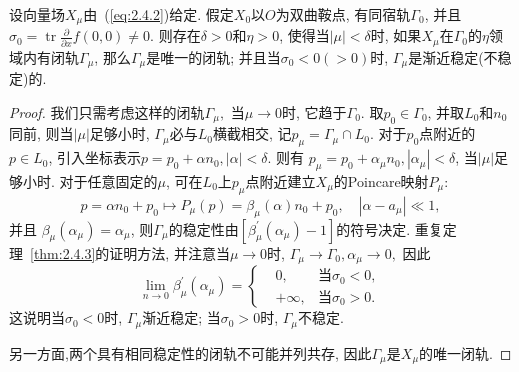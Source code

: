 \begin{theorem}
  \label{thm:2.4.4}
  设向量场$X_{\mu}$由~(\ref{eq:2.4.2})给定.
  假定$X_0$以$O$为双曲鞍点,
  有同宿轨$\Gamma_0$,
  并且$\sigma_{0}=\operatorname{tr} \frac{\partial}{\partial x} f(0,0) \neq 0$.
  则存在$\delta>0$和$\eta>0$,
  使得当$|\mu|<\delta$时,
  如果$X_{\mu}$在$\Gamma_{0}$的$\eta$领域内有闭轨$\Gamma_{\mu}$,
  那么$\Gamma_{\mu}$是唯一的闭轨;
  并且当$\sigma_0<0(>0)$时,
  $\Gamma_{\mu}$是渐近稳定(不稳定)的.
\end{theorem}

\begin{proof}
  我们只需考虑这样的闭轨$\Gamma_{\mu},$
  当$\mu \to 0$时,
  它趋于$\Gamma_0$.
  取$p_0 \in \Gamma_0$,
  并取$L_0$和$n_0$同前,
  则当$|\mu|$足够小时,
  $\Gamma_{\mu}$必与$L_0$横截相交,
  记$p_{\mu}=\Gamma_{\mu} \cap L_{0}$.
  对于$p_0$点附近的$p\in L_0$,
  引入坐标表示$p=p_{0}+\alpha n_{0},|\alpha|<\delta$.
  则有
  $p_{\mu}=p_{0}+\alpha_{\mu} n_{0},\left|\alpha_{\mu}\right|<\delta$,
  当$|\mu|$足够小时.
  对于任意固定的$\mu$,
  可在$L_0$上$p_{\mu}$点附近建立$X_{\mu}$的Poincare映射$P_{\mu}:$
  $$
p=\alpha n_{0}+p_{0} \mapsto P_{\mu}(p)=\beta_{\mu}(\alpha) n_{0}+p_{0}, \quad\left|\alpha-a_{\mu}\right| \ll 1,
$$
并且
$\beta_{\mu}\left(\alpha_{\mu}\right)=\alpha_{\mu}$,
则$\Gamma_{\mu}$的稳定性由$\left[\beta_{\mu}^{\prime}\left(\alpha_{\mu}\right)-1\right]$的符号决定.
重复定理~\ref{thm:2.4.3}的证明方法,
并注意当$\mu\to 0$时,
$\Gamma_{\mu} \rightarrow \Gamma_{0}, \alpha_{\mu} \rightarrow 0,$
因此
\begin{equation}
  \lim _{n \rightarrow 0} \beta_{\mu}^{\prime}\left(\alpha_{\mu}\right)=
  \left\{
    \begin{array}{l}
            &{0,} &\text{当} \sigma_0<0,\\
      &{+\infty,} &\text{当} \sigma_0>0.
    \end{array}
  \right.
\end{equation}
这说明当$\sigma_0<0$时,
$\Gamma_{\mu}$渐近稳定;
当$\sigma_0>0$时,
$\Gamma_{\mu}$不稳定.
\par
另一方面,两个具有相同稳定性的闭轨不可能并列共存,
因此$\Gamma_{\mu}$是$X_{\mu}$的唯一闭轨.
\end{proof}

